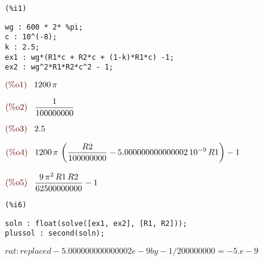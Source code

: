 \documentclass{article}
\begin{document}
\noindent
\begin{minipage}[t]{8ex}{\color{red}\bf
\begin{verbatim}
(%i1) 
\end{verbatim}}
\end{minipage}
\begin{minipage}[t]{\textwidth}{\color{blue}
\begin{verbatim}
wg : 600 * 2* %pi;
c : 10^(-8);
k : 2.5;
ex1 : wg*(R1*c + R2*c + (1-k)*R1*c) -1;
ex2 : wg^2*R1*R2*c^2 - 1;
\end{verbatim}}
\end{minipage}
\begin{math}\displaystyle
\parbox{8ex}{\color{labelcolor}(\%o1) }
1200\,\pi 
\end{math}

\begin{math}\displaystyle
\parbox{8ex}{\color{labelcolor}(\%o2) }
\frac{1}{100000000}
\end{math}

\begin{math}\displaystyle
\parbox{8ex}{\color{labelcolor}(\%o3) }
2.5
\end{math}

\begin{math}\displaystyle
\parbox{8ex}{\color{labelcolor}(\%o4) }
1200\,\pi \,\left( \frac{R2}{100000000}-5.000000000000002\,{10}^{-9}\,R1\right) -1
\end{math}

\begin{math}\displaystyle
\parbox{8ex}{\color{labelcolor}(\%o5) }
\frac{9\,{\pi }^{2}\,R1\,R2}{62500000000}-1
\end{math}


\noindent
\begin{minipage}[t]{8ex}{\color{red}\bf
\begin{verbatim}
(%i6) 
\end{verbatim}}
\end{minipage}
\begin{minipage}[t]{\textwidth}{\color{blue}
\begin{verbatim}
soln : float(solve([ex1, ex2], [R1, R2]));
plussol : second(soln);
\end{verbatim}}
\end{minipage}
\begin{math}\displaystyle
rat: replaced -5.000000000000002e-9 by -1/200000000 = -5.e-9
\end{math}
\end{document}
